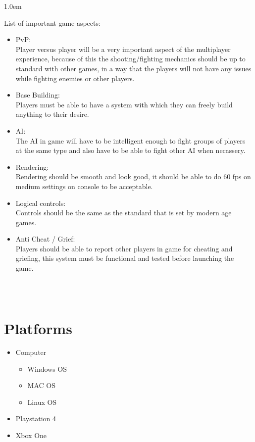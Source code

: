 \documentclass[a4paper]{report}
\newcounter{oldtocdepth}
\newcommand{\hidefromtoc}{%
  \setcounter{oldtocdepth}{\value{tocdepth}}%
  \addtocontents{toc}{\protect\setcounter{tocdepth}{-10}}%
}
\newcommand{\unhidefromtoc}{%
  \addtocontents{toc}{\protect\setcounter{tocdepth}{\value{oldtocdepth}}}%
  
  \renewcommand{\cftchapleader}{\cftdotfill{\cftdotsep}}
}
\begin{document}
\kern 1.0em

List of important game aspects:
\begin{itemize}
	\item PvP: \ \\
	Player versus player will be a very important aspect of the multiplayer experience, because of this the shooting/fighting mechanics should be up to standard with other games, in a way that the players will not have any issues while fighting enemies or other players.

	\item Base Building: \ \\
	Players must be able to have a system with which they can freely build anything to their desire.
	
	\item AI: \ \\
	The AI in game will have to be intelligent enough to fight groups of players at the same type and also have to be able to fight other AI when necassery.

	\item Rendering: \ \\
	Rendering should be smooth and look good, it should be able to do 60 fps on medium settings on console to be acceptable.

	\item Logical controls: \ \\
	Controls should be the same as the standard that is set by modern age games.

	\item Anti Cheat / Grief: \ \\
	Players should be able to report other players in game for cheating and griefing, this system must be functional and tested before launching the game.
\end{itemize}

\clearpage \ \\ \\

\hidefromtoc
\section *{Platforms}
\unhidefromtoc


\begin{itemize}
	\item Computer
	\begin{itemize}
		\item Windows OS
		\item MAC OS
		\item Linux OS
	\end{itemize}
	\item Playstation 4
	\item Xbox One
\end{itemize}
\end{document}
